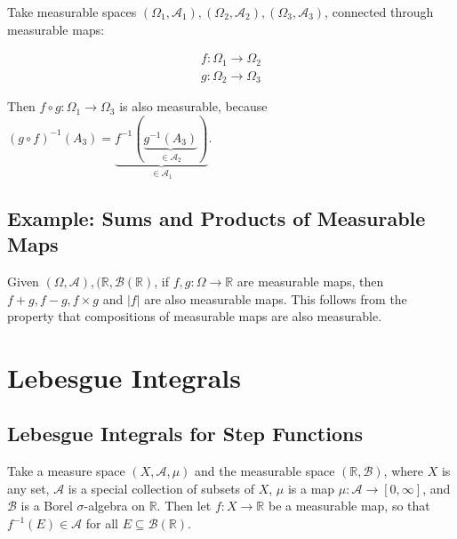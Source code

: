 Take measurable spaces $(\Omega_1,\mathscr{A}_1),(\Omega_2,\mathscr{A}_2),(\Omega_3,\mathscr{A}_3)$,  connected through measurable maps:

\begin{equation}
\begin{array}{l}
f: \Omega_1 \rightarrow \Omega_2 \\
g: \Omega_2 \rightarrow \Omega_3
\end{array}
\end{equation}

Then $f \circ g: \Omega_1 \rightarrow \Omega_3$ is also measurable, because $(g\circ f)^{-1}(A_3) = \underbrace{f^{-1}(\underbrace{g^{-1}(A_3)}_{\in \mathscr{A}_2})}_{\in \mathscr{A}_1}$.	 


\subsection{Example: Sums and Products of Measurable Maps}
Given $(\Omega,\mathscr{A}), (\mathbb{R},\mathscr{B}(\mathbb{R})$, if $f,g: \Omega \rightarrow \mathbb{R}$ 	are measurable maps, then $f+g, f-g, f\times g$ and $|f|$ are also measurable maps. This follows from the property that compositions of measurable maps are also measurable.



\section{Lebesgue Integrals}
\subsection{Lebesgue Integrals for Step Functions}
Take a measure space $(X,\mathscr{A}, \mu)$ and the measurable space $(\mathbb{R},\mathscr{B})$, where $X$ is any set, $\mathscr{A}$ is a special collection of subsets of $X$, $\mu$ is a map $\mu: \mathscr{A} \rightarrow [0,\infty]$, and $\mathscr{B}$ is a Borel $\sigma$-algebra on $\mathbb{R}$. Then let $f:X \rightarrow \mathbb{R}$ be a measurable map, so that $f^{-1}(E) \in \mathscr{A}$ for all $E\subseteq \mathscr{B}(\mathbb{R})$. 